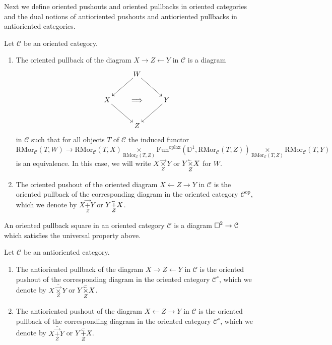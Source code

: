 \documentclass[10pt,oneside]{article}
\newcommand{\cev}[1]{\reflectbox{\ensuremath{\vec{\reflectbox{\ensuremath{#1}}}}}}
\numberwithin{equation}{section} %
\numberwithin{figure}{section} %
\theoremstyle{plain}
\theoremstyle{definition}
\newcommand{\bD}{{\mathbb D}}
\newcommand{\mC}{{\mathcal C}}
\newcommand{\R}{{\mathrm R}}
\newcommand{\op}{\mathrm{op}}
\newcommand{\Fun}{\mathrm{Fun}}
\newcommand{\oplax}{{\mathrm{oplax}}}
\newcommand{\Mor}{{\mathrm{Mor}}}
\newcommand{\cube}{{\,\vline\negmedspace\square}}
\begin{document}
Next we define oriented pushouts and oriented pullbacks in oriented categories and the dual notions of antioriented pushouts and antioriented pullbacks in antioriented categories.

\begin{definition}
Let $\mC$ be an oriented category.
\begin{enumerate}[\normalfont(1)]\setlength{\itemsep}{-2pt}
\item 
The oriented pullback of the diagram $X \to Z\leftarrow Y$ in $\mC$ is a diagram
\[
\xymatrix{& W\ar[rd]\ar[ld] &\\
X\ar[rd] & \Longrightarrow & Y\ar[ld]\\
& Z &}
\]
in $\mC$ such that for all objects $T$ of $\mC$ the induced functor
\[
\R\Mor_{\mC}(T,W)\to \R\Mor_{\mC}(T,X) \underset{\R\Mor_{\mC}(T,Z)}{\times}
\Fun^\oplax(\bD^1,\R\Mor_{\mC}(T,Z)) \underset{\R\Mor_{\mC}(T,Z)}{\times} \R\Mor_{\mC}(T,Y)
\]
is an equivalence.
In this case, we will write $X\underset{Z}{\vec{\times}} Y$ or $ Y\underset{Z}{{\cev\times}} X$ for $W.$


\item 
The oriented pushout of the oriented diagram $X \leftarrow Z\to Y$ in $\mC$ is the oriented pullback of the corresponding diagram in the oriented category $\mC^\op,$ which we denote by $ X\underset{Z}{{\vec{+}}} Y $ or $Y\underset{Z}{\cev{+}} X$.

\end{enumerate}

\end{definition}

\begin{remark}
An oriented pullback square in an oriented category $\mC$ is a diagram $\cube^2\to\mC$ which satisfies the universal property above.
\end{remark}



\begin{definition}
Let $\mC$ be an antioriented category.
\begin{enumerate}[\normalfont(1)]\setlength{\itemsep}{-2pt}
\item 
The antioriented pullback of the diagram $X \to Z\leftarrow Y$ in $\mC$ is the oriented pushout of the corresponding diagram in the oriented category $\mC^\circ$, which we denote by $X\underset{Z}{\bar{\vec{\times}}} Y$ or $ Y\underset{Z}{{\bar{\cev\times}}} X$.

\item 
The antioriented pushout of the diagram $X \leftarrow Z\to Y$ in $\mC$
is the oriented pullback of the corresponding diagram in the oriented category $\mC^\circ$, which we denote by $ X\underset{Z}{{\bar{\vec{+}}}} Y $ or $Y\underset{Z}{\bar{\cev{+}}} X.$

\end{enumerate}

\end{definition}
\end{document}
